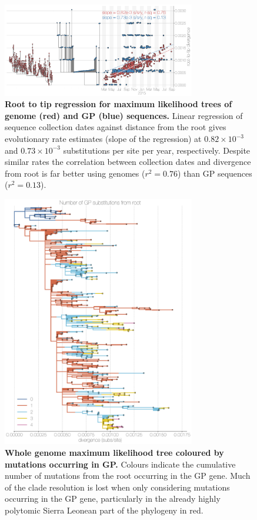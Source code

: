\documentclass[11pt,oneside,letterpaper]{article}
\begin{document}
\begin{figure}[h]
 \centering
	\includegraphics[width=0.75\textwidth]{supp_figures/sfigX_rtt.png}
	\caption{\textbf{Root to tip regression for maximum likelihood trees of genome (red) and GP (blue) sequences.}
  Linear regression of sequence collection dates against distance from the root gives evolutionary rate estimates (slope of the regression) at $0.82\times10^{-3}$ and $0.73\times10^{-3}$ substitutions per site per year, respectively.
  Despite similar rates the correlation between collection dates and divergence from root is far better using genomes ($r^{2}=0.76$) than GP sequences ($r^{2}=0.13$).
	}
	\label{rtt}
\end{figure}

\begin{figure}[h]
 \centering
	\includegraphics[width=0.75\textwidth]{supp_figures/sfigX_embedding.png}
	\caption{\textbf{Whole genome maximum likelihood tree coloured by mutations occurring in GP.}
  Colours indicate the cumulative number of mutations from the root occurring in the GP gene.
  Much of the clade resolution is lost when only considering mutations occurring in the GP gene, particularly in the already highly polytomic Sierra Leonean part of the phylogeny in red.
	}
	\label{embedding}
\end{figure}
\end{document}

